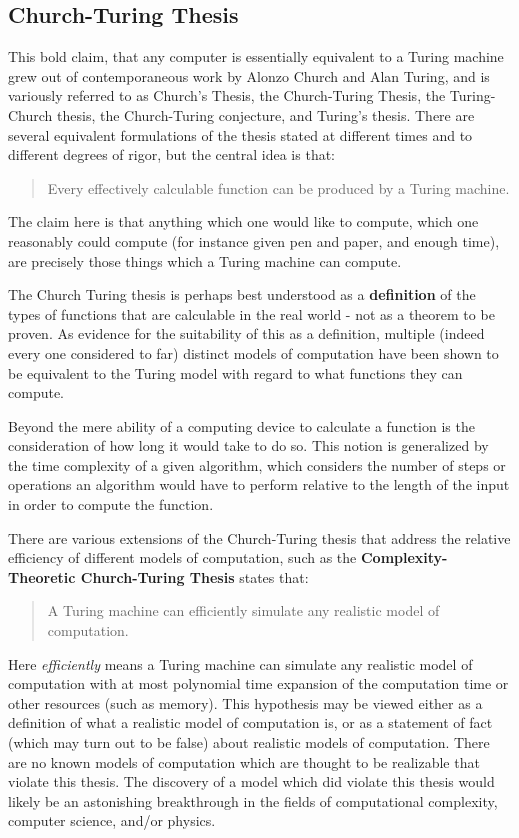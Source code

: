 \documentclass[]{article}
\begin{document}
\subsection{Church-Turing Thesis}

This bold claim, that any computer is essentially equivalent to a
Turing machine grew out of contemporaneous work by Alonzo Church and
Alan Turing, and is variously referred to as Church's Thesis, the
Church-Turing Thesis, the Turing-Church thesis, the Church-Turing
conjecture, and Turing's thesis.  There are several equivalent
formulations of the thesis stated at different times and to different
degrees of rigor, but the central idea is that:

	\begin{quote}
        Every effectively calculable function can be produced by a
        Turing machine.
        \end{quote}

The claim here is that anything which one would like to compute, which
one reasonably could compute (for instance given pen and paper, and
enough time), are precisely those things which a Turing machine can
compute.

The Church Turing thesis is perhaps best understood as a
\textbf{definition} of the types of functions that are calculable in
the real world - not as a theorem to be proven.  As evidence for the
suitability of this as a definition, multiple (indeed every one
considered to far) distinct models of computation have been shown to
be equivalent to the Turing model with regard to what functions they
can compute.

Beyond the mere ability of a computing device to calculate a function
is the consideration of how long it would take to do so.  This notion
is generalized by the time complexity of a given algorithm, which
considers the number of steps or operations an algorithm would have
to perform relative to the length of the input in order to compute the
function.

There are various extensions of the Church-Turing thesis that address
the relative efficiency of different models of computation, such as
the \textbf{Complexity-Theoretic Church-Turing Thesis} states that:

        \begin{quote}
        A Turing machine can efficiently simulate any realistic model
        of computation.
	\end{quote}

Here \emph{efficiently} means a Turing machine can simulate any
realistic model of computation with at most polynomial time expansion
of the computation time or other resources (such as memory).  This
hypothesis may be viewed either as a definition of what a realistic
model of computation is, or as a statement of fact (which may turn out
to be false) about realistic models of computation.  There are no
known models of computation which are thought to be realizable that
violate this thesis.  The discovery of a model which did violate this
thesis would likely be an astonishing breakthrough in the fields of
computational complexity, computer science, and/or physics.
\end{document}
